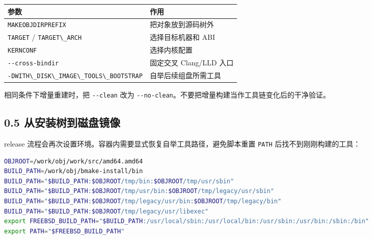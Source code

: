 \documentclass[
  11pt,
  UTF8,
  a4paper,
  fontset=fandol]{ctexart}
\newcommand{\passthrough}[1]{#1}
\begin{document}
\begin{longtable}[]{@{}
  >{\raggedright\arraybackslash}p{}
  >{\raggedright\arraybackslash}p{}@{}}
\toprule\noalign{}
\begin{minipage}[b]{\linewidth}\raggedright
参数
\end{minipage} & \begin{minipage}[b]{\linewidth}\raggedright
作用
\end{minipage} \\
\midrule\noalign{}
\endhead
\bottomrule\noalign{}
\endlastfoot
\passthrough{\lstinline!MAKEOBJDIRPREFIX!} & 把对象放到源码树外 \\
\passthrough{\lstinline!TARGET!} /
\passthrough{\lstinline!TARGET\_ARCH!} & 选择目标机器和 ABI \\
\passthrough{\lstinline!KERNCONF!} & 选择内核配置 \\
\passthrough{\lstinline!--cross-bindir!} & 固定交叉 Clang/LLD 入口 \\
\passthrough{\lstinline!-DWITH\_DISK\_IMAGE\_TOOLS\_BOOTSTRAP!} &
自举后续组盘所需工具 \\
\end{longtable}

相同条件下增量重建时，把 \passthrough{\lstinline!--clean!} 改为
\passthrough{\lstinline!--no-clean!}。不要把增量构建当作工具链变化后的干净验证。

\subsection{0.5
从安装树到磁盘镜像}\label{ux4eceux5b89ux88c5ux6811ux5230ux78c1ux76d8ux955cux50cf}

release 流程会再次设置环境。容器内需要显式恢复自举工具路径，避免脚本重置
\passthrough{\lstinline!PATH!} 后找不到刚刚构建的工具：

\begin{lstlisting}[language=sh]
OBJROOT=/work/obj/work/src/amd64.amd64
BUILD_PATH=/work/obj/bmake-install/bin
BUILD_PATH="$BUILD_PATH:$OBJROOT/tmp/bin:$OBJROOT/tmp/usr/sbin"
BUILD_PATH="$BUILD_PATH:$OBJROOT/tmp/usr/bin:$OBJROOT/tmp/legacy/usr/sbin"
BUILD_PATH="$BUILD_PATH:$OBJROOT/tmp/legacy/usr/bin:$OBJROOT/tmp/legacy/bin"
BUILD_PATH="$BUILD_PATH:$OBJROOT/tmp/legacy/usr/libexec"
export FREEBSD_BUILD_PATH="$BUILD_PATH:/usr/local/sbin:/usr/local/bin:/usr/sbin:/usr/bin:/sbin:/bin"
export PATH="$FREEBSD_BUILD_PATH"
\end{lstlisting}
\end{document}

